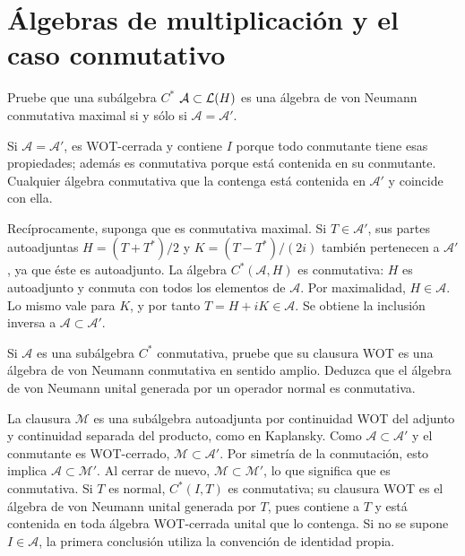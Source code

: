 \chapter{Álgebras de multiplicación y el caso conmutativo}

\begin{ejercicio}\label{ej:v3-l35-1}
Pruebe que una subálgebra $C^*$ $\mathcal A\subset\mathcal L(H)$ es una álgebra de von Neumann conmutativa maximal si y sólo si $\mathcal A=\mathcal A'$.
\end{ejercicio}
\begin{solucion}
Si $\mathcal A=\mathcal A'$, es WOT-cerrada y contiene $I$ porque todo conmutante tiene esas propiedades; además es conmutativa porque está contenida en su conmutante. Cualquier álgebra conmutativa que la contenga está contenida en $\mathcal A'$ y coincide con ella.

Recíprocamente, suponga que es conmutativa maximal. Si $T\in\mathcal A'$, sus partes autoadjuntas $H=(T+T^*)/2$ y $K=(T-T^*)/(2i)$ también pertenecen a $\mathcal A'$, ya que éste es autoadjunto. La álgebra $C^*(\mathcal A,H)$ es conmutativa: $H$ es autoadjunto y conmuta con todos los elementos de $\mathcal A$. Por maximalidad, $H\in\mathcal A$. Lo mismo vale para $K$, y por tanto $T=H+iK\in\mathcal A$. Se obtiene la inclusión inversa a $\mathcal A\subset\mathcal A'$.
\end{solucion}

\begin{ejercicio}\label{ej:v3-l35-2}
Si $\mathcal A$ es una subálgebra $C^*$ conmutativa, pruebe que su clausura WOT es una álgebra de von Neumann conmutativa en sentido amplio. Deduzca que el álgebra de von Neumann unital generada por un operador normal es conmutativa.
\end{ejercicio}
\begin{solucion}
La clausura $\mathcal M$ es una subálgebra autoadjunta por continuidad WOT del adjunto y continuidad separada del producto, como en Kaplansky. Como $\mathcal A\subset\mathcal A'$ y el conmutante es WOT-cerrado, $\mathcal M\subset\mathcal A'$. Por simetría de la conmutación, esto implica $\mathcal A\subset\mathcal M'$. Al cerrar de nuevo, $\mathcal M\subset\mathcal M'$, lo que significa que es conmutativa. Si $T$ es normal, $C^*(I,T)$ es conmutativa; su clausura WOT es el álgebra de von Neumann unital generada por $T$, pues contiene a $T$ y está contenida en toda álgebra WOT-cerrada unital que lo contenga. Si no se supone $I\in\mathcal A$, la primera conclusión utiliza la convención de identidad propia.
\end{solucion}


